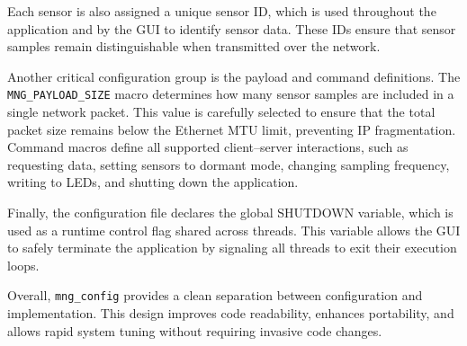 \documentclass{article}
\begin{document}
Each sensor is also assigned a unique sensor ID, which is used throughout the 
application and by the GUI to identify sensor data. These IDs ensure that sensor 
samples remain distinguishable when transmitted over the network.

Another critical configuration group is the payload and command definitions. 
The \texttt{MNG\_PAYLOAD\_SIZE} macro determines how many sensor samples are included in a 
single network packet. This value is carefully selected to ensure that the total 
packet size remains below the Ethernet MTU limit, preventing IP fragmentation. 
Command macros define all supported client–server interactions, such as requesting 
data, setting sensors to dormant mode, changing sampling frequency, writing to LEDs,
and shutting down the application.

Finally, the configuration file declares the global SHUTDOWN variable, which is 
used as a runtime control flag shared across threads. This variable allows the GUI 
to safely terminate the application by signaling all threads to exit their execution 
loops.

Overall, \texttt{mng\_config} provides a clean separation between configuration and 
implementation. This design improves code readability, enhances portability, and 
allows rapid system tuning without requiring invasive code changes.
\end{document}
